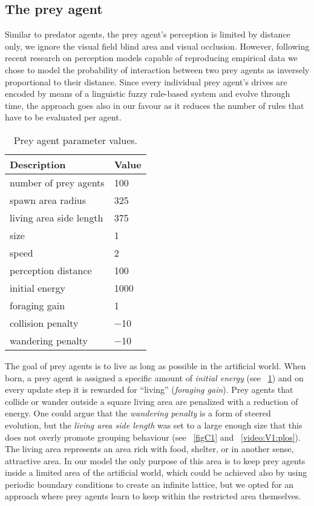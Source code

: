 \subsection{The prey agent}

Similar to predator agents, the prey agent's perception is limited by distance only, \ie we ignore the visual field blind area and visual occlusion. However, following recent research on perception models capable of reproducing empirical data \cite{bode2011limited,hemelrijk2015diffusion} we chose to model the probability of interaction between two prey agents as inversely proportional to their distance. Since every individual prey agent's drives are encoded by means of a linguistic fuzzy rule-based system and evolve through time, the approach goes also in our favour as it reduces the number of rules that have to be evaluated per agent. 

\begin{table}
	\caption{Prey agent parameter values.}
	\label{tab:prey}
	\begin{tabular}{ll}
		\toprule
		Description & Value \\
		\midrule
		number of prey agents & 100 \\
		spawn area radius & 325 \\
		living area side length & 375 \\
		\hdashline
		size & 1 \\
		speed & 2 \\
		perception distance & 100 \\
		\hdashline
		initial energy & \num{1000} \\
		foraging gain & 1 \\
		collision penalty & \num{-10} \\
		wandering penalty & \num{-10} \\
		\bottomrule
	\end{tabular}
\end{table}

The goal of prey agents is to live as long as possible in the artificial world. When born, a prey agent is assigned a specific amount of \emph{initial energy} (see \tablename~\ref{tab:prey}) and on every update step it is rewarded for ``living'' (\emph{foraging gain}). Prey agents that collide or wander outside a square living area are penalized with a reduction of energy. One could argue that the \emph{wandering penalty} is a form of steered evolution, but the \emph{living area side length} was set to a large enough size that this does not overly promote grouping behaviour (see \figurename~\ref{figC1} and \videoname~\ref{video:V1:plos}). The living area represents an area rich with food, shelter, or in another sense, attractive area. In our model the only purpose of this area is to keep prey agents inside a limited area of the artificial world, which could be achieved also by using periodic boundary conditions to create an infinite lattice, but we opted for an approach where prey agents learn to keep within the restricted area themselves. 

